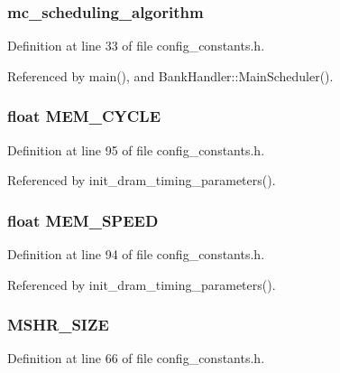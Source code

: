 \subsubsection[{mc\_\-scheduling\_\-algorithm}]{ {\bf mc\_\-scheduling\_\-algorithm}}\label{mc__constants_8h_951b5bcc078c8d83bdc41858085f4717}




Definition at line 33 of file config\_\-constants.h.

Referenced by main(), and BankHandler::MainScheduler().
\subsubsection[{MEM\_\-CYCLE}]{\setlength{\rightskip}{0pt plus 5cm}float {\bf MEM\_\-CYCLE}}\label{mc__constants_8h_12d5c3271551a38aba04e56df6c3c1a7}




Definition at line 95 of file config\_\-constants.h.

Referenced by init\_\-dram\_\-timing\_\-parameters().
\subsubsection[{MEM\_\-SPEED}]{\setlength{\rightskip}{0pt plus 5cm}float {\bf MEM\_\-SPEED}}\label{mc__constants_8h_95c1f638c2a29817a026693bffad0db7}




Definition at line 94 of file config\_\-constants.h.

Referenced by init\_\-dram\_\-timing\_\-parameters().
\subsubsection[{MSHR\_\-SIZE}]{ {\bf MSHR\_\-SIZE}}\label{mc__constants_8h_4f1d8d474d4e841808eb38cf137c9d6e}




Definition at line 66 of file config\_\-constants.h.

